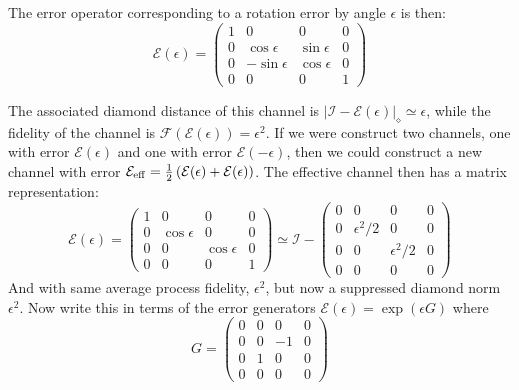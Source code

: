 \documentclass[aps,nofootinbib,pra,notitlepage,twocolumn]{revtex4-1}
\newcommand{\abs}[1]{\left\vert #1 \right\vert}
\newcommand{\error}{\ensuremath{{\mathcal{E}}}}
\begin{document}
The error operator corresponding to a rotation error by angle $\epsilon$ is then:
\begin{equation}
\error(\epsilon) =
	\left(\begin{array}{ccccc}
		1 & 0 & 0 & 0 \\ 
		0 & \cos\epsilon & \sin\epsilon  & 0  \\
		0 & -\sin\epsilon & \cos\epsilon & 0  \\
		0 & 0 & 0 & 1
	\end{array} 	
	\right)
\end{equation}

The associated diamond distance of this channel is $\abs{\mathcal{I} - \error(\epsilon)}_\diamond \simeq \epsilon$, while the fidelity of the channel is $\mathcal{F}(\error(\epsilon)) = \epsilon^2$. If we were construct two channels, one with error $\error(\epsilon)$ and one with error $\error(-\epsilon)$, then we could construct a new channel with error $\error_{\rm eff} = \frac{1}{2}\left(\error(\epsilon) + \error(\epsilon)\right)$. The effective channel then has a matrix representation:
\begin{equation}
	\error(\epsilon) =
	\left(\begin{array}{ccccc}
		1 & 0 & 0 & 0 \\ 
		0 & \cos\epsilon & 0  & 0  \\
		0 & 0 & \cos\epsilon & 0  \\
		0 & 0 & 0 & 1
	\end{array} 	
	\right) \simeq \mathcal{I} - 
	\left(\begin{array}{ccccc}
		0 & 0 & 0 & 0 \\ 
		0 & \epsilon^2/2 & 0  & 0  \\
		0 & 0 & \epsilon^2/2 & 0  \\
		0 & 0 & 0 & 0
	\end{array} 	
	\right)
\end{equation}
And with same average process fidelity, $\epsilon^2$, but now a suppressed diamond norm $\epsilon^2$. Now write this in terms of the error generators $\error(\epsilon) = \exp(\epsilon G)$ where
\begin{equation}
	G =
	\left(\begin{array}{ccccc}
		0 & 0 & 0 & 0 \\ 
		0 & 0 & -1  & 0  \\
		0 & 1 & 0 & 0  \\
		0 & 0 & 0 & 0
	\end{array} 	
	\right)
\end{equation}
\end{document}
